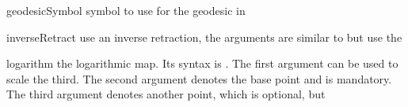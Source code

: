 \documentclass[english,a4paper,DIV=12,parskip=full,oneside]{scrartcl}
\begin{document}
\begin{commandlist}
		\par{}
		\par{} %
		\par{}
		\par{} %
		\par{}
		\par{} %
		\par{}
		\par{} %
		\par{} %
		\par{} %
		\par{} %
	\item[geodesicSymbol] symbol to use for the geodesic in \codeCommand{\geodesic}
		\par\mathCodeExample{\geodesicSymbol}
	\item[inverseRetract] use an inverse retraction, the arguments are similar to \codeCommand{\logarithm} but use the \codeCommand{\retractionSymbol}
	\par{}
	\par{}
	\par{}
	\item[logarithm] the logarithmic map.
		Its syntax is .
		The first argument can be used to scale the third.
		The second argument denotes the base point and is mandatory.
		The third argument denotes another point, which is optional, but

\end{commandlist}
\end{document}
